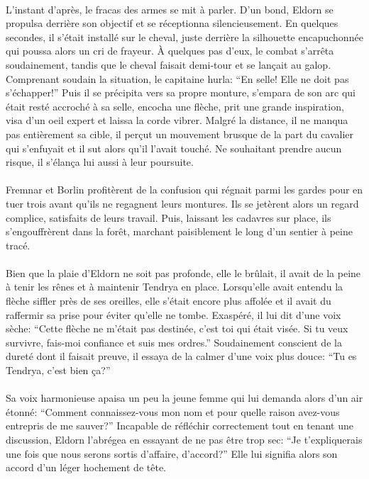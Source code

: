 \paragraph{}
L'instant d'après, le fracas des armes se mit à parler. D'un bond, Eldorn se
propulsa derrière son objectif et se réceptionna silencieusement. En quelques
secondes, il s'était installé sur le cheval, juste derrière la silhouette
encapuchonnée qui poussa alors un cri de frayeur. À quelques pas d'eux, le
combat s'arrêta soudainement, tandis que le cheval faisait demi-tour et se
lançait au galop. Comprenant soudain la situation, le capitaine hurla: ``En
selle! Elle ne doit pas s'échapper!'' Puis il se précipita vers sa propre
monture, s'empara de son arc qui était resté accroché à sa selle, encocha une
flèche, prit une grande inspiration, visa d'un oeil expert et laissa la corde
vibrer. Malgré la distance, il ne manqua pas entièrement sa cible, il perçut
un mouvement brusque de la part du cavalier qui s'enfuyait et il sut alors
qu'il l'avait touché. Ne souhaitant prendre aucun risque, il s'élança lui
aussi à leur poursuite.

\paragraph{}
Fremnar et Borlin profitèrent de la confusion qui régnait parmi les gardes
pour en tuer trois avant qu'ils ne regagnent leurs montures. Ils se jetèrent
alors un regard complice, satisfaits de leurs travail. Puis, laissant les
cadavres sur place, ils s'engouffrèrent dans la forêt, marchant paisiblement
le long d'un sentier à peine tracé.

\paragraph{}
Bien que la plaie d'Eldorn ne soit pas profonde, elle le brûlait, il avait
de la peine à tenir les rênes et à maintenir Tendrya en place. Lorsqu'elle
avait entendu la flèche siffler près de ses oreilles, elle s'était encore
plus affolée et il avait du raffermir sa prise pour éviter qu'elle ne tombe.
Exaspéré, il lui dit d'une voix sèche: ``Cette flèche ne m'était pas
destinée, c'est toi qui était visée. Si tu veux survivre, fais-moi confiance
et suis mes ordres.'' Soudainement conscient de la dureté dont il faisait
preuve, il essaya de la calmer d'une voix plus douce: ``Tu es Tendrya, c'est
bien ça?''

\paragraph{}
Sa voix harmonieuse apaisa un peu la jeune femme qui lui demanda alors d'un
air étonné: ``Comment connaissez-vous mon nom et pour quelle raison avez-vous
entrepris de me sauver?'' Incapable de réfléchir correctement tout en tenant
une discussion, Eldorn l'abrégea en essayant de ne pas être trop sec: ``Je
t'expliquerais une fois que nous serons sortis d'affaire, d'accord?'' Elle
lui signifia alors son accord d'un léger hochement de tête.


